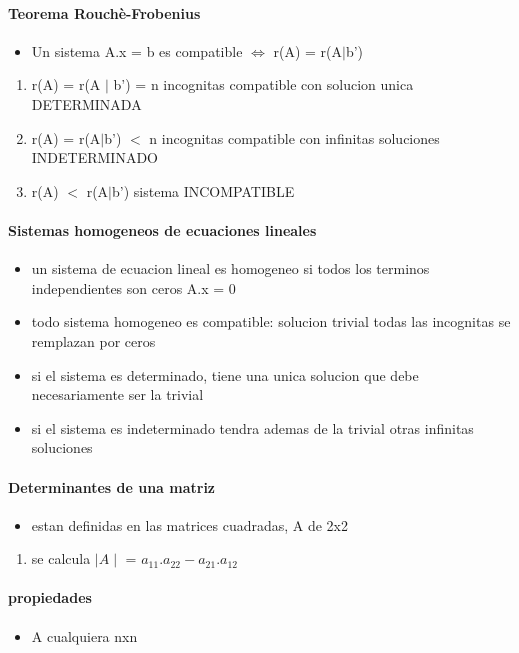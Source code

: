 \documentclass[a4paper]{article}
\begin{document}
\paragraph{Teorema Rouchè-Frobenius}
\begin{itemize}
	\item Un sistema A.x = b es compatible $\Leftrightarrow$ r(A) = r(A$\mid$b')
\end{itemize}
\begin{enumerate}
	\item r(A) = r(A $\mid$ b') = n incognitas compatible con solucion unica DETERMINADA
	\item r(A) = r(A$\mid$b') $<$ n incognitas compatible con infinitas soluciones INDETERMINADO
	\item r(A) $<$ r(A$\mid$b') sistema INCOMPATIBLE
\end{enumerate}

\paragraph{Sistemas homogeneos de ecuaciones lineales}
\begin{itemize}
	\item un sistema de ecuacion lineal es homogeneo si todos los terminos independientes son ceros A.x = 0
	\item todo sistema homogeneo es compatible: solucion trivial todas las incognitas se remplazan por ceros
	\item si el sistema es determinado, tiene una unica solucion que debe necesariamente ser la trivial
	\item si el sistema es indeterminado tendra ademas de la trivial otras infinitas soluciones
\end{itemize}

\paragraph{Determinantes de una matriz}
\begin{itemize}
	\item estan definidas en las matrices cuadradas, A de 2x2 
\end{itemize}
\begin{enumerate}
	\item se calcula $\mid A \mid$ = $a_{11}.a_{22} - a_{21}.a_{12}$
\end{enumerate}

\paragraph{propiedades}
\begin{itemize}
	\item A cualquiera nxn
\end{itemize}
\end{document}

